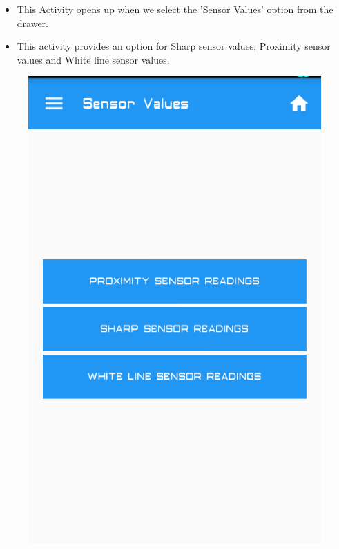 \documentclass[a4paper,12pt,oneside]{book}
\begin{document}
\begin{enumerate}
\begin{itemize}
			\begin{itemize}
				\item This Activity opens up when we select the 'Sensor Values' option from the drawer.
				\item This activity provides an option for Sharp sensor values, Proximity sensor values and White line sensor values.
			\end{itemize} 
			\begin{figure}[h]
				\begin{center}
					\includegraphics[scale=0.4]{selectsensor.png}
				\end{center}
			\end{figure}
			

\end{itemize}
\end{enumerate}
\end{document}
